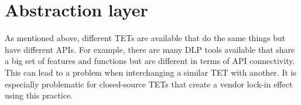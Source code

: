 \section{Abstraction layer}
As mentioned above, different TETs are available that do the same things but have different APIs. For example, there are many DLP tools available that share a big set of features and functions but are different in terms of API connectivity.
This can lead to a problem when interchanging a similar TET with another. It is especially problematic for closed-source TETs that create a vendor lock-in effect using this practice. 

